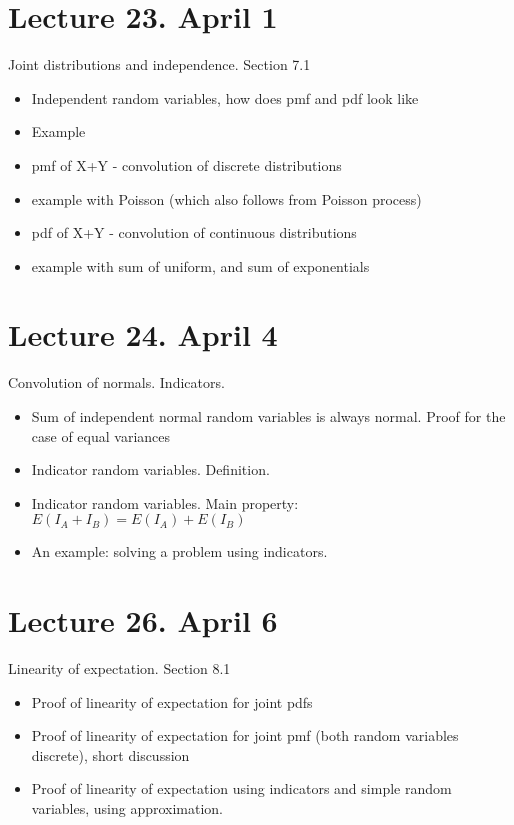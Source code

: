 \documentclass[letterpaper,11pt,oneside,reqno]{amsart}
\numberwithin{equation}{section}
\theoremstyle{definition}
\begin{document}
\section*{Lecture 23. April 1}

Joint distributions and independence. Section 7.1
\begin{itemize}
\item Independent random variables, how does pmf and pdf look like
\item Example
\item pmf of X+Y - convolution of discrete distributions
\item example with Poisson (which also follows from Poisson process)
\item pdf of X+Y - convolution of continuous distributions
\item example with sum of uniform, and sum of exponentials
\end{itemize}

\section*{Lecture 24. April 4}

Convolution of normals. Indicators.
\begin{itemize}
	\item Sum of independent normal random variables
		is always normal. Proof for the case of equal variances
	\item Indicator random variables. Definition.
	\item Indicator random variables. Main property:
		$E(I_A+I_B)=E(I_A)+E(I_B)$
	\item An example: solving a problem using indicators.
\end{itemize}


\section*{Lecture 26. April 6}

Linearity of expectation. Section 8.1
\begin{itemize}
	\item Proof of linearity of expectation for joint pdfs
	\item Proof of linearity of expectation for joint pmf (both random variables discrete), 
		short discussion
	\item Proof of linearity of expectation using indicators and simple random variables, using approximation.
\end{itemize}
\end{document}

